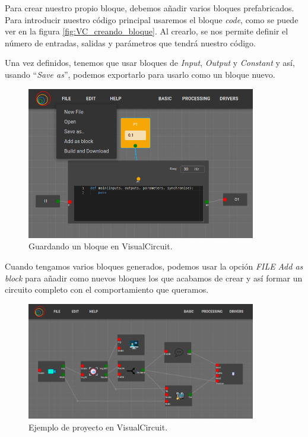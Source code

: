 Para crear nuestro propio bloque, debemos añadir varios bloques prefabricados. Para introducir nuestro código principal usaremos el bloque \textit{code},
como se puede ver en la figura \ref{fig:VC_creando_bloque}. Al crearlo, se nos permite definir el número de entradas, salidas y parámetros que tendrá nuestro código.

Una vez definidos, tenemos que usar bloques de \textit{Input}, \textit{Output} y \textit{Constant} y así, usando ``\textit{Save as}'',
podemos exportarlo para usarlo como un bloque nuevo.
\begin{figure} [H]
  \begin{center}
      \includegraphics[width=10cm]{figs/c4/VC_saveas.png}
  \end{center}
  \caption[Guardando un bloque en VisualCircuit]{Guardando un bloque en VisualCircuit.}
  \label{fig:VC_saveas_bloque}
\end{figure}

Cuando tengamos varios bloques generados, podemos usar la opción \textit{FILE} \overrightarrow{ } \textit{Add as block} para añadir como nuevos bloques
los que acabamos de crear y así formar un circuito completo con el comportamiento que queramos.
\begin{figure} [H]
  \begin{center}
      \includegraphics[width=10cm]{figs/c4/VC_example.png}
  \end{center}
  \caption[Ejemplo de proyecto en VisualCircuit]{Ejemplo de proyecto en VisualCircuit.}
  \label{fig:VC_example}
\end{figure}

